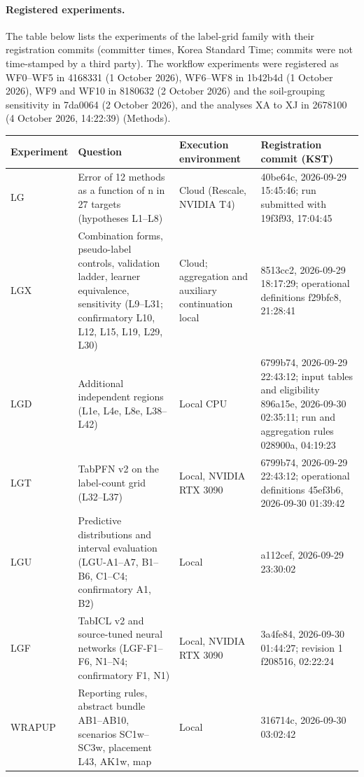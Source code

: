 \paragraph*{Registered experiments.} The table below lists the experiments of the label-grid family with their registration commits (committer times, Korea Standard Time; commits were not time-stamped by a third party). The workflow experiments were registered as WF0--WF5 in 4168331 (1 October 2026), WF6--WF8 in 1b42b4d (1 October 2026), WF9 and WF10 in 8180632 (2 October 2026) and the soil-grouping sensitivity in 7da0064 (2 October 2026), and the analyses XA to XJ in 2678100 (4 October 2026, 14:22:39) (Methods).

{\fontsize{7.5}{9}\selectfont\setlength{\tabcolsep}{4pt}
\begin{longtable}{@{}>{\raggedright\arraybackslash}p{}>{\raggedright\arraybackslash}p{}>{\raggedright\arraybackslash}p{}>{\raggedright\arraybackslash}p{}@{}}
\toprule
\textbf{Experiment} & \textbf{Question} & \textbf{Execution environment} & \textbf{Registration commit (KST)} \\
\midrule\endhead
\bottomrule\endlastfoot
LG & Error of 12 methods as a function of n in 27 targets (hypotheses L1–L8) & Cloud (Rescale, NVIDIA T4) & 40be64c, 2026-09-29 15:45:46; run submitted with 19f3f93, 17:04:45 \\
LGX & Combination forms, pseudo-label controls, validation ladder, learner equivalence, sensitivity (L9–L31; confirmatory L10, L12, L15, L19, L29, L30) & Cloud; aggregation and auxiliary continuation local & 8513cc2, 2026-09-29 18:17:29; operational definitions f29bfc8, 21:28:41 \\
LGD & Additional independent regions (L1e, L4e, L8e, L38–L42) & Local CPU & 6799b74, 2026-09-29 22:43:12; input tables and eligibility 896a15e, 2026-09-30 02:35:11; run and aggregation rules 028900a, 04:19:23 \\
LGT & TabPFN v2 on the label-count grid (L32–L37) & Local, NVIDIA RTX 3090 & 6799b74, 2026-09-29 22:43:12; operational definitions 45ef3b6, 2026-09-30 01:39:42 \\
LGU & Predictive distributions and interval evaluation (LGU-A1–A7, B1–B6, C1–C4; confirmatory A1, B2) & Local & a112cef, 2026-09-29 23:30:02 \\
LGF & TabICL v2 and source-tuned neural networks (LGF-F1–F6, N1–N4; confirmatory F1, N1) & Local, NVIDIA RTX 3090 & 3a4fe84, 2026-09-30 01:44:27; revision 1 f208516, 02:22:24 \\
WRAPUP & Reporting rules, abstract bundle AB1–AB10, scenarios SC1w–SC3w, placement L43, AK1w, map & Local & 316714c, 2026-09-30 03:02:42 \\
\end{longtable}}

